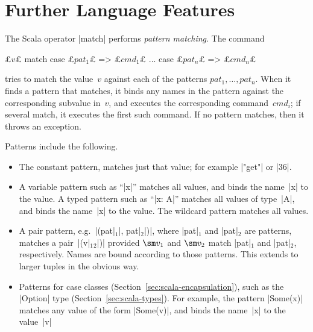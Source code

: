 \section{Further Language Features}
\label{sec:scala-misc}


The Scala operator |match| performs \emph{pattern matching}.  The command
%
\begin{scala}
  £$v$£ match{
    case £$pat_1$£ => £$cmd_1$£
    ...
    case £$pat_n$£ => £$cmd_n$£
  }
\end{scala}
tries to match the value~$v$ against each of the patterns $pat_1, \ldots,
pat_n$.  When it finds a pattern that matches, it binds any names in the
pattern against the corresponding subvalue in~$v$, and executes the corresponding
command~$cmd_i$; if several match, it executes the first such command.  If no
pattern matches, then it throws an exception.

Patterns include the following.
\begin{itemize}
\item The constant pattern, matches just that value; for example |"get"| or
  |36|.

\item A variable pattern such as ``|x|'' matches all values, and binds the
name~|x| to the value.  A typed pattern such as ``|x: A|'' matches all values
of type~|A|, and binds the name~|x| to the value.  The wildcard pattern
\SCALA{\_} matches all values.  

\item A pair pattern, e.g.~|(pat|$_1$|, pat|$_2$|)|, where |pat|$_1$ and
  |pat|$_2$ are patterns, matches a pair~|(v|$_1$$_2$|)| provided
  $\sm v_1$ and $\sm v_2$ match |pat|$_1$ and |pat|$_2$, respectively.  Names
  are bound according to those patterns.  This extends to larger tuples in the
  obvious way.

\item Patterns for case classes (Section~\ref{sec:scala-encapsulation}), such
  as the |Option| type (Section~\ref{sec:scala-types}).  For example, the
  pattern |Some(x)| matches any value of the form |Some(v)|, and binds the
  name~|x| to the value~|v|
\end{itemize}
%

